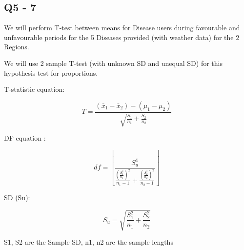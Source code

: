 \documentclass[11pt]{article}
\begin{document}
    \subsection{Q5 - 7}\label{q5---7}

We will perform T-test between means for Disease users during favourable
and unfavourable periods for the 5 Diseases provided (with weather data)
for the 2 Regions.

We will use 2 sample T-test (with unknown SD and unequal SD) for this
hypothesis test for proportions.

T-statistic equation:

\begin{equation*} T = \frac{(\bar x_1 - \bar x_2) - (\mu _1 - \mu _2)} {\sqrt {\frac {S_1}{n_1} + \frac {S_2} {n_2}}} \end{equation*}

DF equation :

\begin{equation*} df = \left \lfloor{\frac{S_u ^ 4} {\frac{( \frac{S_1 ^ 2}{n_1} )^2}{n_1 - 1} + {\frac{( \frac{S_2 ^ 2}{n_2} )^2}{n_2 - 1}}}} \right \rfloor\end{equation*}

SD (Su):

\begin{equation*} S_u = \sqrt{\frac{S_1 ^ 2}{n_1} + \frac{S_2 ^ 2}{n_2}}  \end{equation*}

S1, S2 are the Sample SD, n1, n2 are the sample lengths
\end{document}
